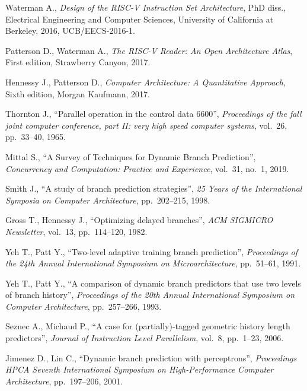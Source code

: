 \begin{thebibliography}{99}
\setlength{\parskip}{0.5\baselineskip}

    Waterman A., 
    \textit{Design of the RISC-V Instruction Set Architecture},
    PhD diss.,
    Electrical Engineering and Computer Sciences,
    University of California at Berkeley,
    2016,
    UCB/EECS-2016-1.

    Patterson D., Waterman A., 
    \textit{The RISC-V Reader: An Open Architecture Atlas},
    First edition,
    Strawberry Canyon,
    2017.

    Hennessy J., Patterson D., 
    \textit{Computer Architecture: A Quantitative Approach},
    Sixth edition,
    Morgan Kaufmann,
    2017.

    Thornton J.,
    ``Parallel operation in the control data 6600'',  
    \textit{Proceedings of the fall joint computer conference, part II: very high speed computer systems},
    vol.~26, pp.~33--40, 
    1965.

    Mittal S.,
    ``A Survey of Techniques for Dynamic Branch Prediction'',  
    \textit{Concurrency and Computation: Practice and Experience},
    vol.~31, no.~1, 
    2019.

    Smith J.,
    ``A study of branch prediction strategies'',  
    \textit{25 Years of the International Symposia on Computer Architecture},
    pp.~202--215, 
    1998.

    Gross T., Hennessy J.,
    ``Optimizing delayed branches'',  
    \textit{ACM SIGMICRO Newsletter},
    vol.~13, pp.~114--120, 
    1982.
    
    Yeh T., Patt Y.,
    ``Two-level adaptive training branch prediction'',  
    \textit{Proceedings of the 24th Annual International Symposium on Microarchitecture},
    pp.~51--61, 
    1991.

    Yeh T., Patt Y.,
    ``A comparison of dynamic branch predictors that use two levels of branch history'',  
    \textit{Proceedings of the 20th Annual International
    Symposium on Computer Architecture},
    pp.~257--266, 
    1993.

    Seznec A., Michaud P.,
    ``A case for (partially)-tagged geometric history length predictors'',  
    \textit{Journal of Instruction Level Parallelism},
    vol.~8, pp.~1--23, 
    2006.

    Jimenez D., Lin C.,
    ``Dynamic branch prediction with perceptrons'',  
    \textit{Proceedings HPCA Seventh International Symposium on High-Performance Computer Architecture},
    pp.~197--206, 
    2001.


\end{thebibliography}
